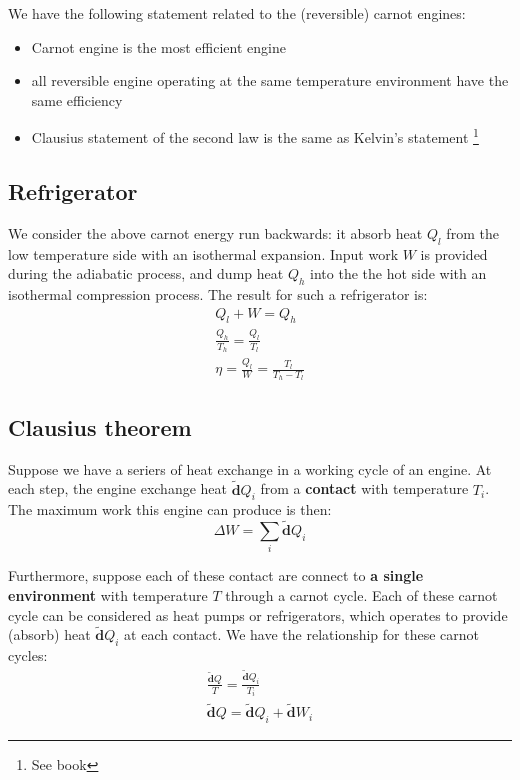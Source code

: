 \documentclass{article}
\newcommand{\dbar}{\mathbf{\tilde{d}}}
\begin{document}
We have the following statement related to the (reversible) carnot engines:
\begin{itemize}
    \item Carnot engine is the most efficient engine
    \item all reversible engine operating at the same temperature environment have the same efficiency
    \item Clausius statement of the second law is the same as Kelvin's statement \footnote{See book}
\end{itemize}

\subsection{Refrigerator}
We consider the above carnot energy run backwards: it absorb heat $Q_l$ from the 
low temperature side with an isothermal expansion. Input work $W$ is provided 
during the adiabatic process, and dump heat $Q_h$ into the the hot side 
with an isothermal compression process. The result for such a refrigerator is:
\begin{gather}
    Q_l + W = Q_h \\
    \frac{Q_h}{T_h} = \frac{Q_l}{T_l} \\
    \eta = \frac{Q_l}{W} = \frac{T_l}{T_h - T_l}
\end{gather} 

\subsection{Clausius theorem}
Suppose we have a seriers of heat exchange in a working cycle of an engine. At 
each step, the engine exchange heat $\dbar Q_i $ from a \textbf{contact} with 
temperature $T_i$. The maximum work this engine can produce is then:
\begin{equation}
    \Delta W = \sum_i \dbar Q_i
\end{equation}

Furthermore, suppose each of these contact are connect to \textbf{a single environment} 
with temperature $T$ through a carnot cycle. Each of these carnot cycle can be considered
as heat pumps or refrigerators, which operates to provide (absorb) heat $\dbar Q_i $
at each contact.
We have the relationship for these carnot cycles:
\begin{gather}
    \frac{\dbar Q}{T} = \frac{\dbar Q_i}{T_i} \\
    \dbar Q = \dbar Q_i + \dbar W_i 
\end{gather}
\end{document}
